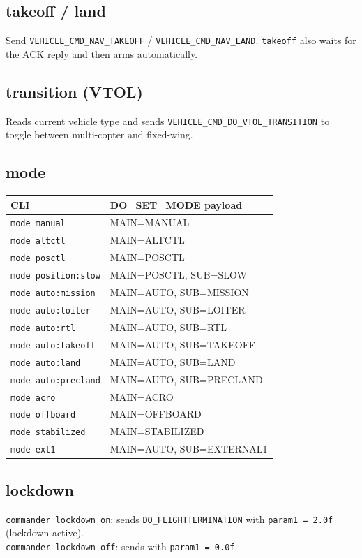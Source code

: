 \documentclass[12pt,a4paper]{article}
\begin{document}
\subsection{takeoff / land}
Send \texttt{VEHICLE\_CMD\_NAV\_TAKEOFF} / \texttt{VEHICLE\_CMD\_NAV\_LAND}.
\texttt{takeoff} also waits for the ACK reply and then arms automatically.

\subsection{transition (VTOL)}
Reads current vehicle type and sends \texttt{VEHICLE\_CMD\_DO\_VTOL\_TRANSITION}
to toggle between multi-copter and fixed-wing.

\subsection{mode}

\begin{center}\begin{tabular}{ll}\toprule
CLI & DO\_SET\_MODE payload \\\midrule
\texttt{mode manual} & MAIN=MANUAL \\
\texttt{mode altctl} & MAIN=ALTCTL \\
\texttt{mode posctl} & MAIN=POSCTL \\
\texttt{mode position:slow} & MAIN=POSCTL, SUB=SLOW \\
\texttt{mode auto:mission} & MAIN=AUTO, SUB=MISSION \\
\texttt{mode auto:loiter} & MAIN=AUTO, SUB=LOITER \\
\texttt{mode auto:rtl} & MAIN=AUTO, SUB=RTL \\
\texttt{mode auto:takeoff} & MAIN=AUTO, SUB=TAKEOFF \\
\texttt{mode auto:land} & MAIN=AUTO, SUB=LAND \\
\texttt{mode auto:precland} & MAIN=AUTO, SUB=PRECLAND \\
\texttt{mode acro} & MAIN=ACRO \\
\texttt{mode offboard} & MAIN=OFFBOARD \\
\texttt{mode stabilized} & MAIN=STABILIZED \\
\texttt{mode ext1} & MAIN=AUTO, SUB=EXTERNAL1 \\
\bottomrule\end{tabular}\end{center}

\subsection{lockdown}
\texttt{commander lockdown on}: sends \texttt{DO\_FLIGHTTERMINATION} with
\texttt{param1 = 2.0f} (lockdown active). \\
\texttt{commander lockdown off}: sends with \texttt{param1 = 0.0f}.
\end{document}
